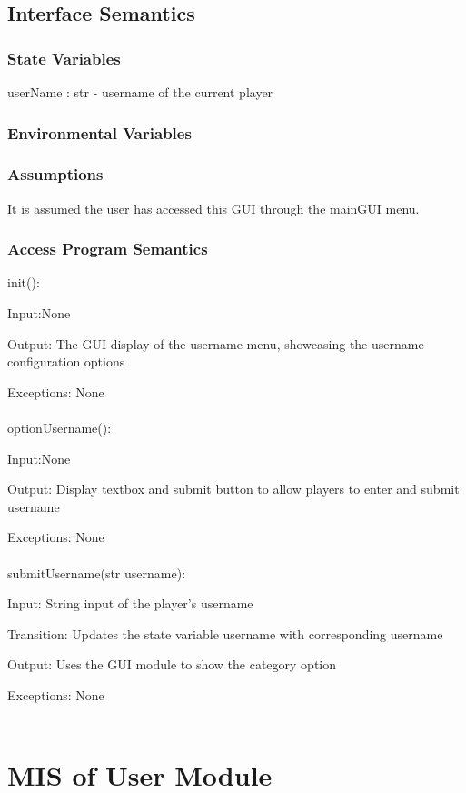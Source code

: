 \documentclass[12,english]{article}
\begin{document}
		\subsection{Interface Semantics}
		\subsubsection{State Variables}
		userName : str - username of the current player
		\subsubsection{Environmental Variables}
		\subsubsection{Assumptions}
		It is assumed the user has accessed this GUI through the mainGUI menu. \\
		
		\subsubsection{Access Program Semantics}
		
		init():
		
		Input:None
		
		Output: The GUI display of the username menu, showcasing the username configuration options
		
		Exceptions: None\\
		\\
		optionUsername():
		
		Input:None
		
		Output: Display textbox and submit button to allow players to enter and submit username
		
		Exceptions: None\\
		\\
		submitUsername(str username):
		
		Input: String input of the player's username
		
		Transition: Updates the state variable username with corresponding username
		
		Output: Uses the GUI module to show the category option
		
		Exceptions: None\\
		\\

	
\section{MIS of User Module}
\end{document}
